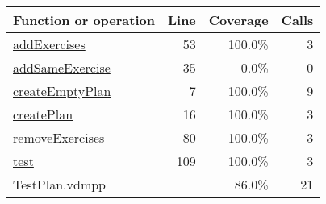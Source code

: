 \begin{longtable}{|l|r|r|r|}
\hline
Function or operation & Line & Coverage & Calls \\
\hline
\hline
\hyperref[addExercises:53]{addExercises} & 53&100.0\% & 3 \\
\hline
\hyperref[addSameExercise:35]{addSameExercise} & 35&0.0\% & 0 \\
\hline
\hyperref[createEmptyPlan:7]{createEmptyPlan} & 7&100.0\% & 9 \\
\hline
\hyperref[createPlan:16]{createPlan} & 16&100.0\% & 3 \\
\hline
\hyperref[removeExercises:80]{removeExercises} & 80&100.0\% & 3 \\
\hline
\hyperref[test:109]{test} & 109&100.0\% & 3 \\
\hline
\hline
TestPlan.vdmpp & & 86.0\% & 21 \\
\hline
\end{longtable}

